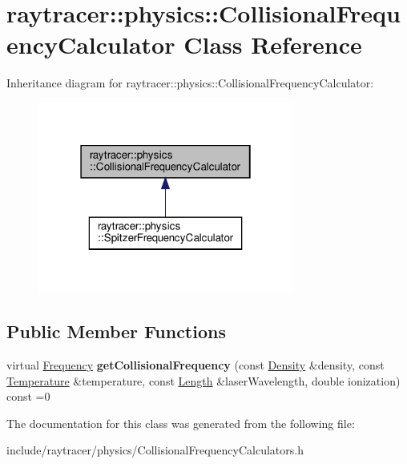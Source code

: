 \hypertarget{classraytracer_1_1physics_1_1CollisionalFrequencyCalculator}{}\section{raytracer\+:\+:physics\+:\+:Collisional\+Frequency\+Calculator Class Reference}
\label{classraytracer_1_1physics_1_1CollisionalFrequencyCalculator}


Inheritance diagram for raytracer\+:\+:physics\+:\+:Collisional\+Frequency\+Calculator\+:
\nopagebreak
\begin{figure}[H]
\begin{center}
\leavevmode
\includegraphics[width=238pt]{classraytracer_1_1physics_1_1CollisionalFrequencyCalculator__inherit__graph}
\end{center}
\end{figure}
\subsection*{Public Member Functions}
\begin{DoxyCompactItemize}
\item 
\mbox{\label{classraytracer_1_1physics_1_1CollisionalFrequencyCalculator_ac713b0d5015c3b3efce852894697f1b8}} 
virtual \hyperlink{structraytracer_1_1physics_1_1Frequency}{Frequency} {\bfseries get\+Collisional\+Frequency} (const \hyperlink{structraytracer_1_1physics_1_1Density}{Density} \&density, const \hyperlink{structraytracer_1_1physics_1_1Temperature}{Temperature} \&temperature, const \hyperlink{structraytracer_1_1physics_1_1Length}{Length} \&laser\+Wavelength, double ionization) const =0
\end{DoxyCompactItemize}


The documentation for this class was generated from the following file\+:\begin{DoxyCompactItemize}
\item 
include/raytracer/physics/Collisional\+Frequency\+Calculators.\+h\end{DoxyCompactItemize}
